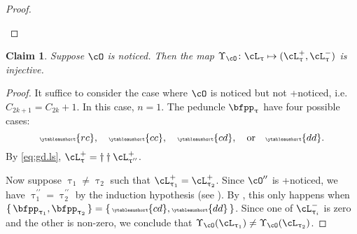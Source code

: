 \documentclass[12pt,a4paper]{amsart}
\def\eDD{\overline{\nabla}}
\numberwithin{equation}{section}
\newtheorem{claim}[thm]{Claim}
\theoremstyle{remark}
\let\ytb=\ytableaushort
\newcommand{\tytb}[1]{{\tiny\ytb{#1}}}
\def\cOpp{\cO^{\prime\prime}}
\def\pcL{\cL^+}
\def\ncL{\cL^-}
\def\uptaupp{\uptau^{\prime\prime}}
\begin{document}
\begin{proof}
\begin{enumPF}
    \end{enumPF}
\end{proof}


\begin{claim}\label{c:gd.noticed.inj}
  Suppose $\cO$ is noticed. Then the map $\Upsilon_{\cO}\colon \cL_{\uptau}\mapsto (\pcL_{\uptau},\ncL_{\uptau})$ is injective.
\end{claim}
\begin{proof}
  It suffice to consider the case where $\cO$ is noticed but not +noticed, i.e.
  $C_{2k+1}=C_{2k}+1$. In this case, $n=1$.
  The peduncle $\bfpp_{\uptau}$ have four possible cases:
  \[
    \tytb{rc}, \quad \tytb{cc}, \quad \tytb{cd},\quad \text{or}\quad  \tytb{dd}.
  \]
  By \eqref{eq:gd.ls}, $\pcL_{\uptau} = \dagger\dagger\pcL_{\uptaupp}$.

  Now suppose $\uptau_{1}\neq \uptau_{2}$ such that
  $\pcL_{\uptau_{1}}=\pcL_{\uptau_{2}}$.
  Since $\cOpp$ is +noticed, we have $\uptaupp_{1}=\uptaupp_{2}$ by the induction
  hypothesis (see ).
  By , this only happens when
  $\set{\bfpp_{\uptau_{1}},\bfpp_{\uptau_{2}}}=\set{\tytb{cd},\tytb{dd}}$.
  Since one of $\ncL_{\uptau_{i}}$ is zero and the other is non-zero, we
  conclude that $\Upsilon_{\cO}(\cL_{\uptau_{1}})\neq \Upsilon_{\cO}(\cL_{\uptau_{2}})$.
\end{proof}
\end{document}
